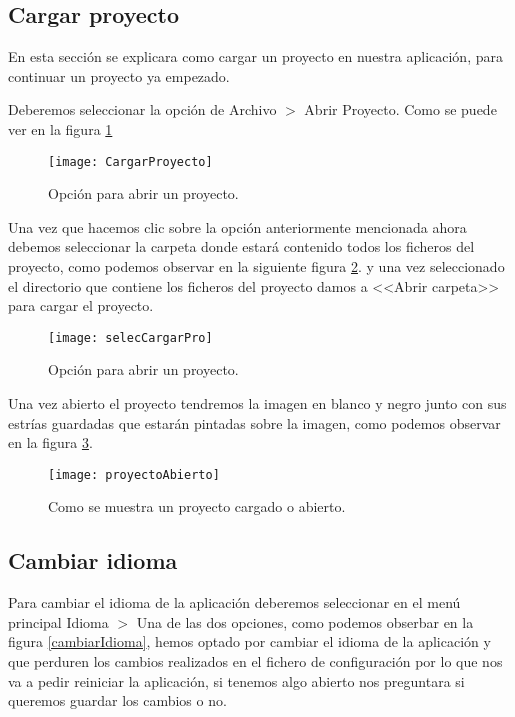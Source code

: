 \label{modo:2}
\subsection{Cargar proyecto}
En esta sección se explicara como cargar un proyecto en nuestra aplicación, para continuar un proyecto ya empezado.

Deberemos seleccionar la opción de Archivo  $>$ Abrir Proyecto. Como se puede ver en la figura \ref{fig:cargarPro}


\begin{figure}[h]
\centering
\texttt{[image: CargarProyecto]}
\caption{Opción para abrir un proyecto.}
\label{fig:cargarPro}
\end{figure}

Una vez que hacemos clic sobre la opción anteriormente mencionada ahora debemos seleccionar la carpeta donde estará contenido todos los ficheros del proyecto, como podemos observar en la siguiente figura \ref{fig:selecCargarPro}. y una vez seleccionado el directorio que contiene los ficheros del proyecto damos a <<Abrir carpeta>> para cargar el proyecto. 



\begin{figure}[h]
\centering
\texttt{[image: selecCargarPro]}
\caption{Opción para abrir un proyecto.}
\label{fig:selecCargarPro}
\end{figure}

Una vez abierto el proyecto tendremos la imagen en blanco y negro junto con sus estrías guardadas que estarán pintadas sobre la imagen, como podemos observar en la figura \ref{fig:proyectoAbierto}.


\begin{figure}[h]
\centering
\texttt{[image: proyectoAbierto]}
\caption{Como se muestra un proyecto cargado o abierto.}
\label{fig:proyectoAbierto}
\end{figure}

\label{modo:idioma}
\subsection{Cambiar idioma}
Para cambiar el idioma de la aplicación deberemos seleccionar en el menú principal Idioma $>$ Una de las dos opciones, como podemos obserbar en la figura \ref{cambiarIdioma}, hemos optado por cambiar el idioma de la aplicación y que perduren los cambios realizados en el fichero de configuración por lo que nos va a pedir reiniciar la aplicación, si tenemos algo abierto nos preguntara si queremos guardar los cambios o no.

